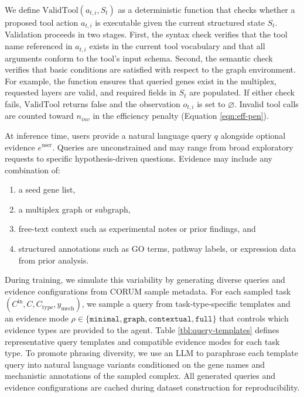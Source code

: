 \documentclass[thesis,letterpaper,12pt]{utthesis}
\begin{document}
We define $\text{ValidTool}(a_{t,i}, S_t)$ as a deterministic function that checks whether a proposed tool action $a_{t,i}$ is executable given the current structured state $S_t$. Validation proceeds in two stages. First, the syntax check verifies that the tool name referenced in $a_{t,i}$ exists in the current tool vocabulary and that all arguments conform to the tool's input schema. Second, the semantic check verifies that basic conditions are satisfied with respect to the graph environment. For example, the function ensures that queried genes exist in the multiplex, requested layers are valid, and required fields in $S_t$ are populated. If either check fails, $\text{ValidTool}$ returns false and the observation $o_{t,i}$ is set to $\varnothing$. Invalid tool calls are counted toward $n_{inv}$ in the efficiency penalty (Equation \ref{eqn:eff-pen}).

At inference time, users provide a natural language query $q$ alongside optional evidence $e^{\text{user}}$. Queries are unconstrained and may range from broad exploratory requests to specific hypothesis-driven questions. Evidence may include any combination of:
\begin{enumerate}
    \item a seed gene list,
    \item a multiplex graph or subgraph,
    \item free-text context such as experimental notes or prior findings, and
    \item structured annotations such as GO terms, pathway labels, or expression data from prior analysis.
\end{enumerate}

During training, we simulate this variability by generating diverse queries and evidence configurations from CORUM sample metadata. For each sampled task $(C^{\text{in}}, C, C_{\text{type}}, y_{\text{mech}})$, we sample a query from task-type-specific templates and an evidence mode $\rho \in \{\texttt{minimal}, \texttt{graph}, \texttt{contextual}, \texttt{full}\}$ that controls which evidence types are provided to the agent. Table \ref{tbl:query-templates} defines representative query templates and compatible evidence modes for each task type. To promote phrasing diversity, we use an LLM to paraphrase each template query into natural language variants conditioned on the gene names and mechanistic annotations of the sampled complex. All generated queries and evidence configurations are cached during dataset construction for reproducibility.
\end{document}

